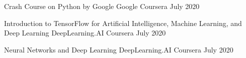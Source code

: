 


\begin{cventries}


\cventry
{Crash Course on Python by Google}
{Google Coursera}
{July 2020}
{}{}

\cventry
{Introduction to TensorFlow for Artificial Intelligence, Machine Learning, and Deep Learning}
{DeepLearning.AI Coursera}
{July 2020}
{}{}

\cventry
{Neural Networks and Deep Learning}
{DeepLearning.AI Coursera}
{July 2020}{}
{}



\end{cventries}